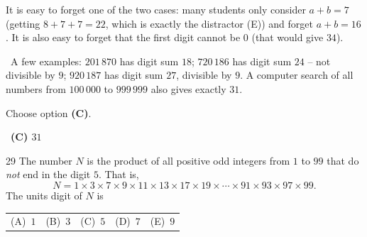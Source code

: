 \documentclass[11pt]{article}
\makeatletter
\providecommand{\AnsWord}{Đáp số}
\newenvironment{probbox}[2]{\begin{probboxT}{#1}{#2}}{\end{probboxT}}
\newcommand{\ans}[1]{\par\smallskip{\bfseries\color{tmGreen!88!black}\AnsWord:}\ {\bfseries\color{AnsRed}#1}\par}
\newcommand{\verify}[1]{\par\smallskip\noindent{\bfseries\color{tmGreen!80!black}\faCheckCircle\ \CheckWord}\ #1\par}
\newcommand{\choices}[5]{\par\smallskip\noindent
  \begin{tabularx}{\linewidth}{@{}XXXXX@{}}(A)\ #1&(B)\ #2&(C)\ #3&(D)\ #4&(E)\ #5\end{tabularx}\par}
\def\AnsWord{Answer}
\def\CheckWord{Check:}
\makeatother
\begin{document}
{\begin{warnbox}It is easy to forget one of the two cases: many students only consider $a+b=7$ (getting $8+7+7=22$, which is exactly the distractor (E)) and forget $a+b=16$. It is also easy to forget that the first digit cannot be $0$ (that would give $34$).\end{warnbox}

\verify{A few examples: $201\,870$ has digit sum $18$; $720\,186$ has digit sum $24$ -- not divisible by $9$; $920\,187$ has digit sum $27$, divisible by $9$. A computer search of all numbers from $100\,000$ to $999\,999$ also gives exactly $31$.}
Choose option \textbf{(C)}.
\ans{(C) $31$}
}


\begin{probbox}{29}{\relax}
The number $N$ is the product of all positive odd integers from $1$ to $99$ that do \emph{not} end in the digit $5$. That is,
\[N=1\times 3\times 7\times 9\times 11\times 13\times 17\times 19\times\cdots\times 91\times 93\times 97\times 99.\]
The units digit of $N$ is
\choices{$1$}{$3$}{$5$}{$7$}{$9$}
\end{probbox}
\end{document}
